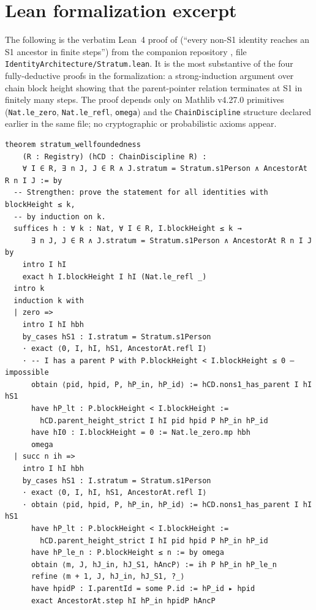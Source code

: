 \documentclass[11pt,a4paper,parskip=half-,DIV=12,headings=standardclasses]{scrartcl}
\theoremstyle{ncthm}
\theoremstyle{ncdef}
\begin{document}
\section{Lean formalization excerpt}\label{app:lean-excerpt}

The following is the verbatim Lean~4 proof of 
(``every non-S1 identity reaches an S1 ancestor in finite steps'')
from the companion repository
\cite{cormier-identity-arch-lean-2026}, file
\texttt{IdentityArchitecture/Stratum.lean}. It is the most
substantive of the four fully-deductive proofs in the formalization:
a strong-induction argument over chain block height showing that the
parent-pointer relation terminates at S1 in finitely many steps. The
proof depends only on Mathlib v4.27.0 primitives (\texttt{Nat.le\_zero},
\texttt{Nat.le\_refl}, \texttt{omega}) and the
\texttt{ChainDiscipline} structure declared earlier in the same file;
no cryptographic or probabilistic axioms appear.

\begin{lstlisting}[basicstyle=\ttfamily\footnotesize,language={}]
theorem stratum_wellfoundedness
    (R : Registry) (hCD : ChainDiscipline R) :
    ∀ I ∈ R, ∃ n J, J ∈ R ∧ J.stratum = Stratum.s1Person ∧ AncestorAt R n I J := by
  -- Strengthen: prove the statement for all identities with blockHeight ≤ k,
  -- by induction on k.
  suffices h : ∀ k : Nat, ∀ I ∈ R, I.blockHeight ≤ k →
      ∃ n J, J ∈ R ∧ J.stratum = Stratum.s1Person ∧ AncestorAt R n I J by
    intro I hI
    exact h I.blockHeight I hI (Nat.le_refl _)
  intro k
  induction k with
  | zero =>
    intro I hI hbh
    by_cases hS1 : I.stratum = Stratum.s1Person
    · exact ⟨0, I, hI, hS1, AncestorAt.refl I⟩
    · -- I has a parent P with P.blockHeight < I.blockHeight ≤ 0 — impossible
      obtain ⟨pid, hpid, P, hP_in, hP_id⟩ := hCD.nons1_has_parent I hI hS1
      have hP_lt : P.blockHeight < I.blockHeight :=
        hCD.parent_height_strict I hI pid hpid P hP_in hP_id
      have hI0 : I.blockHeight = 0 := Nat.le_zero.mp hbh
      omega
  | succ n ih =>
    intro I hI hbh
    by_cases hS1 : I.stratum = Stratum.s1Person
    · exact ⟨0, I, hI, hS1, AncestorAt.refl I⟩
    · obtain ⟨pid, hpid, P, hP_in, hP_id⟩ := hCD.nons1_has_parent I hI hS1
      have hP_lt : P.blockHeight < I.blockHeight :=
        hCD.parent_height_strict I hI pid hpid P hP_in hP_id
      have hP_le_n : P.blockHeight ≤ n := by omega
      obtain ⟨m, J, hJ_in, hJ_S1, hAncP⟩ := ih P hP_in hP_le_n
      refine ⟨m + 1, J, hJ_in, hJ_S1, ?_⟩
      have hpidP : I.parentId = some P.id := hP_id ▸ hpid
      exact AncestorAt.step hI hP_in hpidP hAncP
\end{lstlisting}
\end{document}
